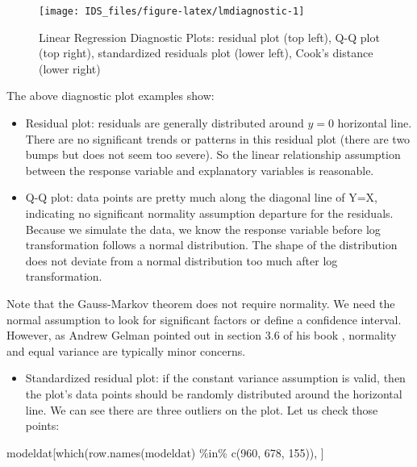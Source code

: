 \documentclass[
  12pt,
]{krantz}
\makeatletter
\newenvironment{Shaded}{\begin{snugshade}}{\end{snugshade}}
\newcommand{\DecValTok}[1]{\textcolor[rgb]{0.06,0.06,0.06}{#1}}
\newcommand{\FunctionTok}[1]{\textcolor[rgb]{0,0,0}{#1}}
\newcommand{\NormalTok}[1]{#1}
\newcommand{\SpecialCharTok}[1]{\textcolor[rgb]{0,0,0}{#1}}
\providecommand{\tightlist}{%
  \setlength{\itemsep}{0pt}\setlength{\parskip}{0pt}}
\newenvironment{kframe}{%
\medskip{}
\setlength{\fboxsep}{.8em}
 \def\at@end@of@kframe{}%
 \ifinner\ifhmode%
  \def\at@end@of@kframe{\end{minipage}}%
  \begin{minipage}{\columnwidth}%
 \fi\fi%
 \def\FrameCommand##1{\hskip\@totalleftmargin \hskip-\fboxsep
 \colorbox{shadecolor}{##1}\hskip-\fboxsep
     \hskip-\linewidth \hskip-\@totalleftmargin \hskip\columnwidth}%
 \MakeFramed {\advance\hsize-\width
   \@totalleftmargin\z@ \linewidth\hsize
   \@setminipage}}%
 {\par\unskip\endMakeFramed%
 \at@end@of@kframe}
\renewenvironment{Shaded}{\begin{kframe}}{\end{kframe}}
\makeatother
\begin{document}
\begin{figure}

{\centering \texttt{[image: IDS\_files/figure-latex/lmdiagnostic-1]} 

}

\caption{Linear Regression Diagnostic Plots: residual plot (top left), Q-Q plot (top right), standardized residuals plot (lower left), Cook's distance (lower right)}\label{fig:lmdiagnostic}
\end{figure}

The above diagnostic plot examples show:

\begin{itemize}
\item
  Residual plot: residuals are generally distributed around \(y=0\) horizontal line. There are no significant trends or patterns in this residual plot (there are two bumps but does not seem too severe). So the linear relationship assumption between the response variable and explanatory variables is reasonable.
\item
  Q-Q plot: data points are pretty much along the diagonal line of Y=X, indicating no significant normality assumption departure for the residuals. Because we simulate the data, we know the response variable before log transformation follows a normal distribution. The shape of the distribution does not deviate from a normal distribution too much after log transformation.
\end{itemize}

Note that the Gauss-Markov theorem does not require normality. We need the normal assumption to look for significant factors or define a confidence interval. However, as Andrew Gelman pointed out in section 3.6 of his book \citep{linear2006}, normality and equal variance are typically minor concerns.

\begin{itemize}
\tightlist
\item
  Standardized residual plot: if the constant variance assumption is valid, then the plot's data points should be randomly distributed around the horizontal line. We can see there are three outliers on the plot. Let us check those points:
\end{itemize}

\begin{Shaded}
\begin{Highlighting}[]
\NormalTok{modeldat[}\FunctionTok{which}\NormalTok{(}\FunctionTok{row.names}\NormalTok{(modeldat) }\SpecialCharTok{\%in\%} \FunctionTok{c}\NormalTok{(}\DecValTok{960}\NormalTok{, }\DecValTok{678}\NormalTok{, }\DecValTok{155}\NormalTok{)), ]}
\end{Highlighting}
\end{Shaded}
\end{document}
